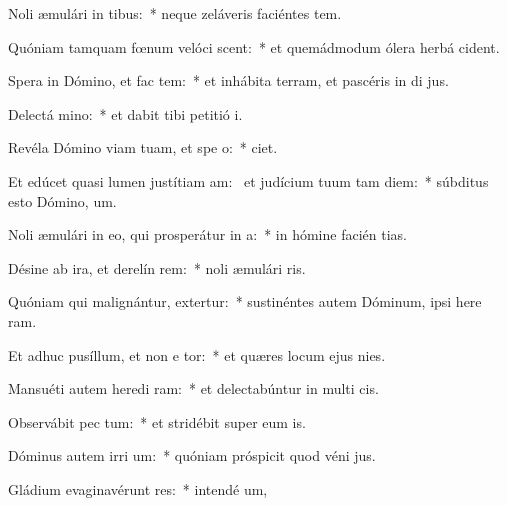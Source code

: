 \item Noli æmulári in tibus:~* neque zeláveris faciéntes tem.
\item Quóniam tamquam fœnum velóci scent:~* et quemádmodum ólera herbá  cident.
\item Spera in Dómino, et fac tem:~* et inhábita terram, et pascéris in di jus.
\item Delectá  mino:~* et dabit tibi petitió  i.
\item Revéla Dómino viam tuam, et spe  o:~*   ciet.
\item Et edúcet quasi lumen justítiam am:~\pscross{} et judícium tuum tam diem:~* súbditus esto Dómino,   um.
\item Noli æmulári in eo, qui prosperátur in  a:~* in hómine facién tias.
\item Désine ab ira, et derelín rem:~* noli æmulári  ris.
\item Quóniam qui malignántur, extertur:~* sustinéntes autem Dóminum, ipsi here ram.
\item Et adhuc pusíllum, et non e tor:~* et quæres locum ejus   nies.
\item Mansuéti autem heredi ram:~* et delectabúntur in multi cis.
\item Observábit pec tum:~* et stridébit super eum  is.
\item Dóminus autem irri um:~* quóniam próspicit quod véni  jus.
\item Gládium evaginavérunt res:~* intendé  um,
